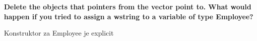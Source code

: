 \documentclass{article}
\newcommand{\localtextbulletone}{\textcolor{black}{\raisebox{.45ex}{\rule{.6ex}{.6ex}}}}
\newcommand{\QandA}[2]{
	\vspace{2.5em}
	\localtextbulletone \hspace{2pt} {\bf #1}

	\vspace{1em}
	#2}
\newcommand{\codedir}{C:/Users/Jakov/FESB/2. semestar/3D simulacije/Izvještaji/vjezba1}
\begin{document}
\pagebreak

\QandA%
{Delete the objects that pointers from the vector point to. What would happen if you tried to assign a wstring to a variable of type Employee?}
{Konstruktor za Employee je explicit}

\begin{codesection}

\end{codesection}

\begin{codesection}

\end{codesection}
\end{document}
